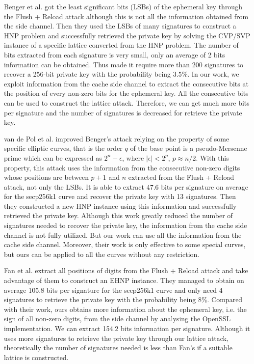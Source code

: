 Benger et al. \cite{Benger2014} got the least significant bits (LSBs) of the ephemeral key through the Flush + Reload attack
although this is not all the information obtained from the side channel.
Then they used the LSBs of many signatures to construct a HNP problem and
successfully retrieved the private key by solving the CVP/SVP instance of a specific lattice converted from the HNP problem.
The number of bits extracted from each signature is very small, only an average of 2 bits information can be obtained.
Thus made it require more than $200$ signatures to recover a 256-bit private key with the probability being $3.5\%$.
In our work, we exploit information from the cache side channel to extract the consecutive bits at the position of every non-zero bits for the ephemeral key.
All the consecutive bits can be used to construct the lattice attack.
Therefore, we can get much more bits per signature and the number of signatures is decreased for retrieve the private key.

van de Pol et al. \cite{Van2015} improved Benger's attack  relying on the property of some specific elliptic curves, that is the order $q$ of the base point is a pseudo-Mersenne prime which can be expressed as $2^n - \epsilon$, where $|\epsilon| < 2^p $, $p \approx n/2$.
With this property, this attack uses the information from the consecutive non-zero digits whose positions are between $p+1$ and $n$ extracted from the Flush + Reload attack, not only the LSBs.
It is able to extract $47.6$ bits per signature on average for the secp256k1 curve and recover the private key with 13 signatures.
Then they constructed a new HNP instance using this information and
successfully retrieved the private key.
Although this work greatly reduced the number of signatures needed to recover the private key,
the information from the cache side channel is not fully utilized.
But our work can use all the information from the cache side channel.
Moreover, their work is only effective to some special curves,
 but ours can be applied to all the curves without any restriction.


Fan et al.\cite{Fan2016} extract all positions of digits from the Flush + Reload attack and take advantage of them to construct an EHNP instance.
They managed to obtain on average 105.8 bits per signature for the secp256k1 curve
 and only need 4 signatures to retrieve the private key with the probability being $8\%$.
 Compared with their work, ours obtains more information about the ephemeral key, i.e. the sign of all non-zero digits, from the side channel by analysing the OpenSSL implementation.
We can extract 154.2 bits information per signature.
Although it uses more signatures to retrieve the private key through our lattice attack,
theoretically the number of signatures needed is less than Fan's if a suitable lattice is constructed.

